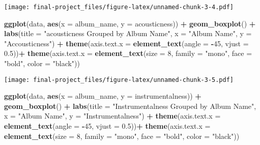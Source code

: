 \documentclass[
]{article}
\newenvironment{Shaded}{\begin{snugshade}}{\end{snugshade}}
\newcommand{\AttributeTok}[1]{\textcolor[rgb]{0.13,0.29,0.53}{#1}}
\newcommand{\DecValTok}[1]{\textcolor[rgb]{0.00,0.00,0.81}{#1}}
\newcommand{\FloatTok}[1]{\textcolor[rgb]{0.00,0.00,0.81}{#1}}
\newcommand{\FunctionTok}[1]{\textcolor[rgb]{0.13,0.29,0.53}{\textbf{#1}}}
\newcommand{\NormalTok}[1]{#1}
\newcommand{\SpecialCharTok}[1]{\textcolor[rgb]{0.81,0.36,0.00}{\textbf{#1}}}
\newcommand{\StringTok}[1]{\textcolor[rgb]{0.31,0.60,0.02}{#1}}
\begin{document}
\texttt{[image: final-project\_files/figure-latex/unnamed-chunk-3-4.pdf]}

\begin{Shaded}
\begin{Highlighting}[]
\FunctionTok{ggplot}\NormalTok{(data, }\FunctionTok{aes}\NormalTok{(}\AttributeTok{x =}\NormalTok{ album\_name, }\AttributeTok{y =}\NormalTok{ acousticness)) }\SpecialCharTok{+}
  \FunctionTok{geom\_boxplot}\NormalTok{() }\SpecialCharTok{+}
  \FunctionTok{labs}\NormalTok{(}\AttributeTok{title =} \StringTok{"acousticness Grouped by Album Name"}\NormalTok{, }
       \AttributeTok{x =} \StringTok{"Album Name"}\NormalTok{, }
       \AttributeTok{y =} \StringTok{"Accousticness"}\NormalTok{) }\SpecialCharTok{+}
  \FunctionTok{theme}\NormalTok{(}\AttributeTok{axis.text.x =} \FunctionTok{element\_text}\NormalTok{(}\AttributeTok{angle =} \SpecialCharTok{{-}}\DecValTok{45}\NormalTok{, }\AttributeTok{vjust =} \FloatTok{0.5}\NormalTok{))}\SpecialCharTok{+}
  \FunctionTok{theme}\NormalTok{(}\AttributeTok{axis.text.x =} \FunctionTok{element\_text}\NormalTok{(}\AttributeTok{size =} \DecValTok{8}\NormalTok{, }\AttributeTok{family =} \StringTok{"mono"}\NormalTok{, }\AttributeTok{face =} \StringTok{"bold"}\NormalTok{, }\AttributeTok{color =} \StringTok{"black"}\NormalTok{))}
\end{Highlighting}
\end{Shaded}

\texttt{[image: final-project\_files/figure-latex/unnamed-chunk-3-5.pdf]}

\begin{Shaded}
\begin{Highlighting}[]
\FunctionTok{ggplot}\NormalTok{(data, }\FunctionTok{aes}\NormalTok{(}\AttributeTok{x =}\NormalTok{ album\_name, }\AttributeTok{y =}\NormalTok{ instrumentalness)) }\SpecialCharTok{+}
  \FunctionTok{geom\_boxplot}\NormalTok{() }\SpecialCharTok{+}
  \FunctionTok{labs}\NormalTok{(}\AttributeTok{title =} \StringTok{"Instrumentalness Grouped by Album Name"}\NormalTok{, }
       \AttributeTok{x =} \StringTok{"Album Name"}\NormalTok{, }
       \AttributeTok{y =} \StringTok{"Instrumentalness"}\NormalTok{) }\SpecialCharTok{+}
  \FunctionTok{theme}\NormalTok{(}\AttributeTok{axis.text.x =} \FunctionTok{element\_text}\NormalTok{(}\AttributeTok{angle =} \SpecialCharTok{{-}}\DecValTok{45}\NormalTok{, }\AttributeTok{vjust =} \FloatTok{0.5}\NormalTok{))}\SpecialCharTok{+}
  \FunctionTok{theme}\NormalTok{(}\AttributeTok{axis.text.x =} \FunctionTok{element\_text}\NormalTok{(}\AttributeTok{size =} \DecValTok{8}\NormalTok{, }\AttributeTok{family =} \StringTok{"mono"}\NormalTok{, }\AttributeTok{face =} \StringTok{"bold"}\NormalTok{, }\AttributeTok{color =} \StringTok{"black"}\NormalTok{))}
\end{Highlighting}
\end{Shaded}
\end{document}
